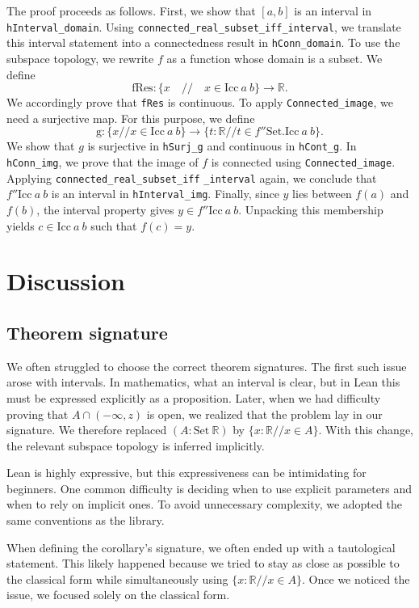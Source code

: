 \documentclass[11pt, oneside]{article}
\theoremstyle{plain}
\theoremstyle{definition}
\newcommand{\R}{\mathbb{R}}
\begin{document}
The proof proceeds as follows.
First, we show that $[a,b]$ is an interval in \verb|hInterval_domain|.
Using \verb|connected_real_subset_iff_interval|, we translate this interval statement into a connectedness result in \verb|hConn_domain|.
To use the subspace topology, we rewrite $f$ as a function whose domain is a subset.
We define
\[
\text{fRes} : \{x \quad // \quad x \in \mathrm{Icc}\ a\ b\} \to \mathbb{R}.
\]
We accordingly prove that \verb|fRes| is continuous.
To apply \verb|Connected_image|, we need a surjective map.
For this purpose, we define
\[
\text{g} : \{x // x \in \mathrm{Icc}\ a\ b\} \to \{t : \mathbb{R} // t \in f'' \mathrm{Set.Icc}\ a\ b\}.
\]
We show that $g$ is surjective in \verb |hSurj_g| and continuous in \verb|hCont_g|.
In \verb|hConn_img|, we prove that the image of $f$ is connected using \verb|Connected_image|.
Applying \verb|connected_real_subset_iff| \verb|_interval| again, we conclude that $f '' \mathrm{Icc}\ a\ b$ is an interval in \verb|hInterval_img|.
Finally, since $y$ lies between $f(a)$ and $f(b)$, the interval property gives $y \in f '' \mathrm{Icc}\ a\ b$.
Unpacking this membership yields $c \in \mathrm{Icc}\ a\ b$ such that $f(c) = y$.


\section{Discussion}

\subsection{Theorem signature}
We often struggled to choose the correct theorem signatures. The first such issue arose with intervals. In mathematics, what an interval is clear, but in Lean this must be expressed explicitly as a proposition.
Later, when we had difficulty proving that $A \cap (-\infty, z)$ is open, we realized that the problem lay in our signature. We therefore replaced $(A: \text{Set}\ \R)$ by $\{x : \R // x \in A\}$. With this change, the relevant subspace topology is inferred implicitly.

Lean is highly expressive, but this expressiveness can be intimidating for beginners. One common difficulty is deciding when to use explicit parameters and when to rely on implicit ones. To avoid unnecessary complexity, we adopted the same conventions as the library.

When defining the corollary’s signature, we often ended up with a tautological statement. This likely happened because we tried to stay as close as possible to the classical form while simultaneously using $\{x : \R // x \in A\}$. Once we noticed the issue, we focused solely on the classical form.
\end{document}
